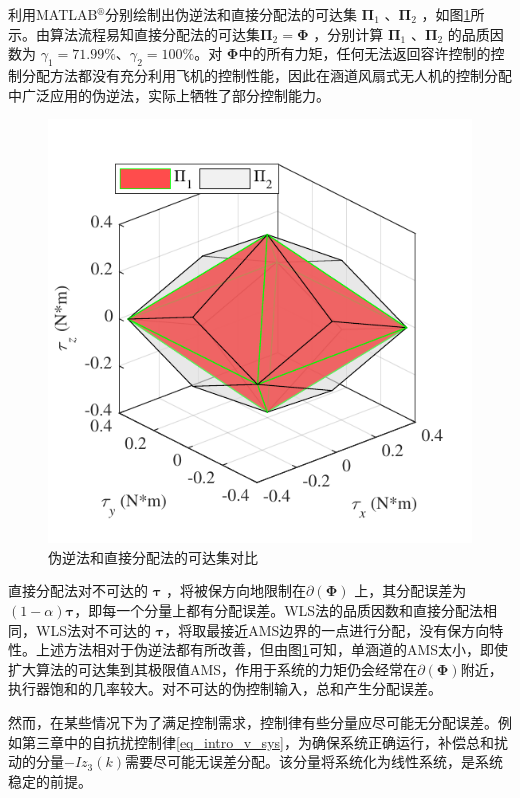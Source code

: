 利用MATLAB$^\circledR$分别绘制出伪逆法和直接分配法的可达集 $\bm{\Pi}_1 $ 、$\bm{\Pi}_2 $  ，如图\ref{fig_AMS}所示。由算法流程易知直接分配法的可达集$\bm{\Pi}_2=\bm{\Phi} $ ，分别计算  $\bm{\Pi}_1 $ 、$\bm{\Pi}_2 $ 的品质因数为 ${\gamma _1} = 71.99\% $、${\gamma _2} = 100\% $。对 $ \bm{\Phi}$中的所有力矩，任何无法返回容许控制的控制分配方法都没有充分利用飞机的控制性能\cite{Durham_2017}，因此在涵道风扇式无人机的控制分配中广泛应用的伪逆法，实际上牺牲了部分控制能力。
\begin{figure}[htbp]
	\centering	
	\includegraphics[scale=1]{Fig/Fig4.pdf}
	\caption{\label{fig_AMS}伪逆法和直接分配法的可达集对比}
\end{figure}

直接分配法对不可达的 $ \bm{\tau} $ ，将被保方向地限制在$\partial(\bm{\Phi})$ 上，其分配误差为$(1-\alpha)\bm{\tau}$，即每一个分量上都有分配误差。WLS法的品质因数和直接分配法相同，WLS法对不可达的 $ \bm{\tau} $，将取最接近AMS边界的一点进行分配，没有保方向特性。上述方法相对于伪逆法都有所改善，但由图\ref{fig_AMS}可知，单涵道的AMS太小，即使扩大算法的可达集到其极限值AMS，作用于系统的力矩仍会经常在$\partial(\bm{\Phi})$附近，执行器饱和的几率较大。对不可达的伪控制输入，总和产生分配误差。

然而，在某些情况下为了满足控制需求，控制律有些分量应尽可能无分配误差。例如第三章中的自抗扰控制律\eqref{eq_intro_v_sys}，为确保系统正确运行，补偿总和扰动的分量$ -I z_{3}(k) $需要尽可能无误差分配。该分量将系统化为线性系统，是系统稳定的前提。
